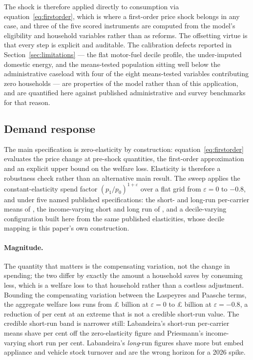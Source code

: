 The shock is therefore applied directly to consumption via equation~\eqref{eq:firstorder}, which is where a first-order price shock belongs in any case, and three of the five scored instruments are computed from the model's eligibility and household variables rather than as reforms. The offsetting virtue is that every step is explicit and auditable. The calibration defects reported in Section~\ref{sec:limitations} --- the flat motor-fuel decile profile, the under-imputed domestic energy, and the means-tested population sitting well below the administrative caseload with four of the eight means-tested variables contributing zero households --- are properties of the model rather than of this application, and are quantified here against published administrative and survey benchmarks for that reason.

\subsection{Demand response}
\label{app:elasticity}

The main specification is zero-elasticity by construction: equation~\eqref{eq:firstorder} evaluates the price change at pre-shock quantities, the \citet{deaton1980} first-order approximation and an explicit upper bound on the welfare loss. Elasticity is therefore a robustness check rather than an alternative main result. The sweep applies the constant-elasticity spend factor $(p_1/p_0)^{1+\varepsilon}$ over a flat grid from $\varepsilon = 0$ to $-0.8$, and under five named published specifications: the short- and long-run per-carrier means of \citet{labandeira2017}, the income-varying short and long run of \citet{priesmann2025}, and a decile-varying configuration built here from the same published elasticities, whose decile mapping is this paper's own construction.

\paragraph{Magnitude.} The quantity that matters is the compensating variation, not the change in spending; the two differ by exactly the amount a household saves by consuming less, which is a welfare loss to that household rather than a costless adjustment. Bounding the compensating variation between the Laspeyres and Paasche terms, the aggregate welfare loss runs from \pounds\genElasticityAggZeroBn{} billion at $\varepsilon = 0$ to \pounds\genCvLowerHighEpsBn{} billion at $\varepsilon = -0.8$, a reduction of \genWelfareShavedHighEpsPct{} per cent at an extreme that is not a credible short-run value. The credible short-run band is narrower still: Labandeira's short-run per-carrier means shave \genLabandeiraShortWelfareShaved{} per cent off the zero-elasticity figure and Priesmann's income-varying short run \genPriesmannShortWelfareShaved{} per cent. Labandeira's \emph{long}-run figures shave more but embed appliance and vehicle stock turnover and are the wrong horizon for a 2026 spike.

